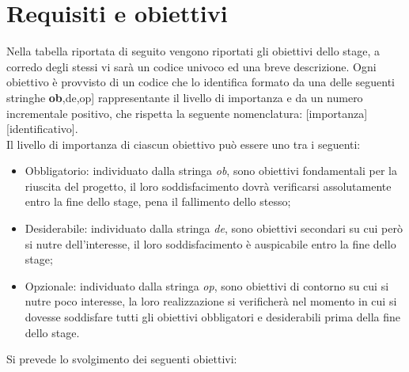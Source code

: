 \section{Requisiti e obiettivi}
Nella tabella riportata di seguito vengono riportati gli obiettivi dello stage, a corredo degli stessi vi sarà un codice univoco ed una breve descrizione. Ogni obiettivo è provvisto di un codice che lo identifica formato da una delle seguenti stringhe \textbf{ob},de,op] rappresentante il livello di importanza e da un numero incrementale positivo, che rispetta la seguente nomenclatura: [importanza][identificativo].\\ 
Il livello di importanza di ciascun obiettivo può essere uno tra i seguenti:
\begin{itemize}
    \item Obbligatorio: individuato dalla stringa \textit{ob}, sono obiettivi fondamentali per la riuscita del progetto, il loro soddisfacimento dovrà verificarsi assolutamente entro la fine dello stage, pena il fallimento dello stesso;
    \item Desiderabile: individuato dalla stringa \textit{de}, sono obiettivi secondari su cui però si nutre dell'interesse, il loro soddisfacimento è auspicabile entro la fine dello stage;
    \item Opzionale: individuato dalla stringa \textit{op}, sono obiettivi di contorno su cui si nutre poco interesse, la loro realizzazione si verificherà nel momento in cui si dovesse soddisfare tutti gli obiettivi obbligatori e desiderabili prima della fine dello stage.
\end{itemize}
Si prevede lo svolgimento dei seguenti obiettivi:
